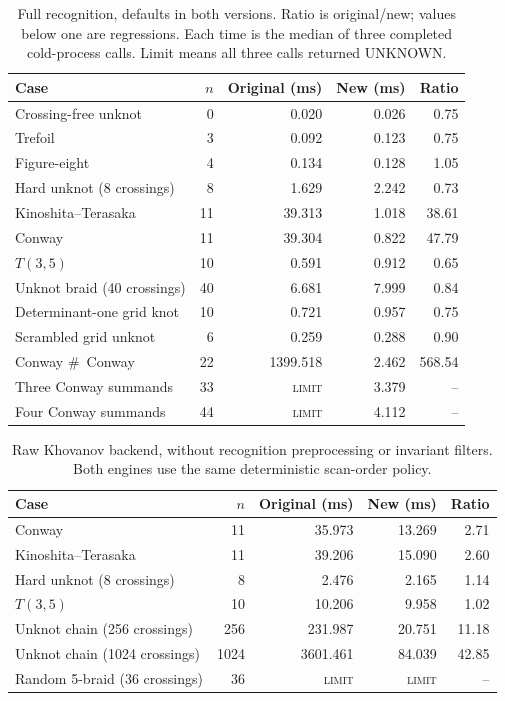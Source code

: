 \begin{table}[htbp]\centering\small
\begin{tabular}{@{}lrrrr@{}}
\toprule Case & $n$ & Original (ms) & New (ms) & Ratio \\
\midrule
Crossing-free unknot & 0 & 0.020 & 0.026 & 0.75 \\
Trefoil & 3 & 0.092 & 0.123 & 0.75 \\
Figure-eight & 4 & 0.134 & 0.128 & 1.05 \\
Hard unknot (8 crossings) & 8 & 1.629 & 2.242 & 0.73 \\
Kinoshita--Terasaka & 11 & 39.313 & 1.018 & 38.61 \\
Conway & 11 & 39.304 & 0.822 & 47.79 \\
$T(3,5)$ & 10 & 0.591 & 0.912 & 0.65 \\
Unknot braid (40 crossings) & 40 & 6.681 & 7.999 & 0.84 \\
Determinant-one grid knot & 10 & 0.721 & 0.957 & 0.75 \\
Scrambled grid unknot & 6 & 0.259 & 0.288 & 0.90 \\
Conway $\#\,$ Conway & 22 & 1399.518 & 2.462 & 568.54 \\
Three Conway summands & 33 & \textsc{limit} & 3.379 & -- \\
Four Conway summands & 44 & \textsc{limit} & 4.112 & -- \\
\bottomrule\end{tabular}
\caption{Full recognition, defaults in both versions. Ratio is original/new; values below one are regressions. Each time is the median of three completed cold-process calls. Limit means all three calls returned UNKNOWN.}\label{tab:recognition}
\end{table}

\begin{table}[htbp]\centering\small
\begin{tabular}{@{}lrrrr@{}}
\toprule Case & $n$ & Original (ms) & New (ms) & Ratio \\
\midrule
Conway & 11 & 35.973 & 13.269 & 2.71 \\
Kinoshita--Terasaka & 11 & 39.206 & 15.090 & 2.60 \\
Hard unknot (8 crossings) & 8 & 2.476 & 2.165 & 1.14 \\
$T(3,5)$ & 10 & 10.206 & 9.958 & 1.02 \\
Unknot chain (256 crossings) & 256 & 231.987 & 20.751 & 11.18 \\
Unknot chain (1024 crossings) & 1024 & 3601.461 & 84.039 & 42.85 \\
Random 5-braid (36 crossings) & 36 & \textsc{limit} & \textsc{limit} & -- \\
\bottomrule\end{tabular}
\caption{Raw Khovanov backend, without recognition preprocessing or invariant filters. Both engines use the same deterministic scan-order policy.}\label{tab:raw}
\end{table}

